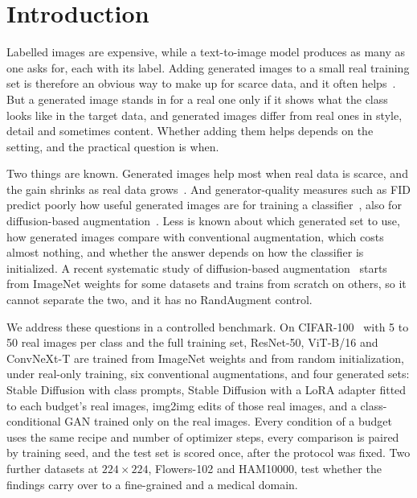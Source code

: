 \section{Introduction}
\label{sec:intro}

Labelled images are expensive, while a text-to-image model produces as many as one asks for, each with its
label. Adding generated images to a small real training set is therefore an obvious way to make up for scarce
data, and it often helps~\cite{he2023synthetic,trabucco2024effective,azizi2023synthetic}. But a generated image
stands in for a real one only if it shows what the class looks like in the target data, and generated images
differ from real ones in style, detail and sometimes content. Whether adding them helps depends on the setting,
and the practical question is when.

Two things are known. Generated images help most when real data is scarce, and the gain shrinks as real data
grows~\cite{he2023synthetic}. And generator-quality measures such as FID predict poorly how useful generated
images are for training a classifier~\cite{ravuri2019classification}, also for diffusion-based
augmentation~\cite{li2026diffusion}. Less is known about which generated set to use, how generated images
compare with conventional augmentation, which costs almost nothing, and whether the answer depends on how the
classifier is initialized. A recent systematic study of diffusion-based augmentation~\cite{li2026diffusion}
starts from ImageNet weights for some datasets and trains from scratch on others, so it cannot separate the two,
and it has no RandAugment control.

We address these questions in a controlled benchmark. On CIFAR-100~\cite{krizhevsky2009learning} with 5 to 50
real images per class and the full training set, ResNet-50, ViT-B/16 and ConvNeXt-T are trained from ImageNet
weights and from random initialization, under real-only training, six conventional augmentations, and four
generated sets: Stable Diffusion with class prompts, Stable Diffusion with a LoRA adapter fitted to each budget's
real images, img2img edits of those real images, and a class-conditional GAN trained only on the real images.
Every condition of a budget uses the same recipe and number of optimizer steps, every comparison is paired by
training seed, and the test set is scored once, after the protocol was fixed. Two further datasets at
$224\times224$, Flowers-102 and HAM10000, test whether the findings carry over to a fine-grained and a medical
domain.

